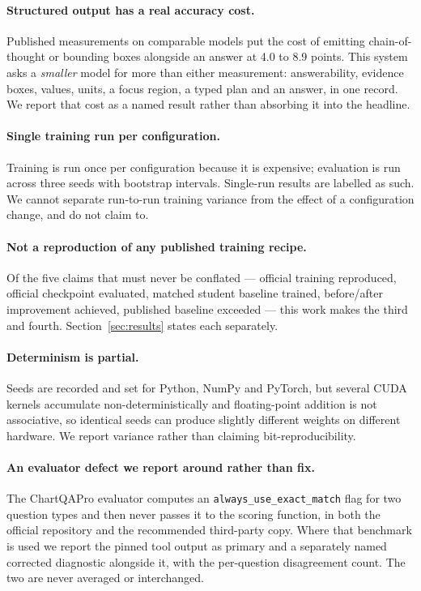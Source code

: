 \paragraph{Structured output has a real accuracy cost.}
Published measurements on comparable models put the cost of emitting chain-of-thought or bounding
boxes alongside an answer at 4.0 to 8.9 points. This system asks a \emph{smaller} model for more
than either measurement: answerability, evidence boxes, values, units, a focus region, a typed plan
and an answer, in one record. We report that cost as a named result rather than absorbing it into
the headline.

\paragraph{Single training run per configuration.}
Training is run once per configuration because it is expensive; evaluation is run across three
seeds with bootstrap intervals. Single-run results are labelled as such. We cannot separate
run-to-run training variance from the effect of a configuration change, and do not claim to.

\paragraph{Not a reproduction of any published training recipe.}
Of the five claims that must never be conflated --- official training reproduced, official
checkpoint evaluated, matched student baseline trained, before/after improvement achieved, published
baseline exceeded --- this work makes the third and fourth. Section~\ref{sec:results} states each
separately.

\paragraph{Determinism is partial.}
Seeds are recorded and set for Python, NumPy and PyTorch, but several CUDA kernels accumulate
non-deterministically and floating-point addition is not associative, so identical seeds can produce
slightly different weights on different hardware. We report variance rather than claiming
bit-reproducibility.

\paragraph{An evaluator defect we report around rather than fix.}
The ChartQAPro evaluator computes an \texttt{always\_use\_exact\_match} flag for two question types
and then never passes it to the scoring function, in both the official repository and the
recommended third-party copy. Where that benchmark is used we report the pinned tool output as
primary and a separately named corrected diagnostic alongside it, with the per-question disagreement
count. The two are never averaged or interchanged.
